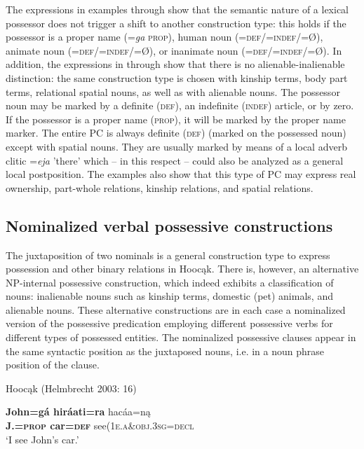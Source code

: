 \documentclass[output=paper]{LSP/langsci}
\begin{document}
The expressions in examples  through  show that the semantic nature of a lexical possessor does not trigger a shift to another construction type: this holds if the possessor is a proper name (=\textit{ga} \textsc{prop}), human noun (=\textsc{def/=indef/}=Ø), animate noun (=\textsc{def/=indef}/=Ø), or inanimate noun (=\textsc{def/=indef}/=Ø). In addition, the expressions in  through  show that there is no alienable-inalienable distinction: the same construction type is chosen with kinship terms, body part terms, relational spatial nouns, as well as with alienable nouns. The possessor noun may be marked by a definite (\textsc{def}), an indefinite (\textsc{indef}) article, or by zero. If the possessor is a proper name (\textsc{prop}), it will be marked by the proper name marker. The entire PC is always definite (\textsc{def}) (marked on the possessed noun) except with spatial nouns. They are usually marked by means of a local adverb clitic =\textit{eja} 'there' which – in this respect – could also be analyzed as a general local postposition. The examples also show that this type of PC may express real ownership, part-whole relations, kinship relations, and spatial relations.

\subsection{Nominalized verbal possessive constructions}
The juxtaposition of two nominals is a general construction type to express possession and other binary relations in Hoocąk. There is, however, an alternative NP-internal possessive construction, which indeed exhibits a classification of nouns: inalienable nouns such as kinship terms, domestic (pet) animals, and alienable nouns. These alternative constructions are in each case a nominalized version of the possessive predication employing different possessive verbs for different types of possessed entities. The nominalized possessive clauses appear in the same syntactic position as the juxtaposed nouns, i.e. in a noun phrase position of the clause. 

\ea Hoocąk (Helmbrecht 2003: 16) \label{seecar}

\ea 
\gll \textbf{John=g\'a hir\'aati=ra}  hac\'aa=n\k{a} \\
\textbf{J.=\textsc{prop} car=\textsc{def}} see(\textsc{1e.a}\&\textsc{obj.3sg}=\textsc{decl} \\
\glt `I see John's car.'  
\end{document}
